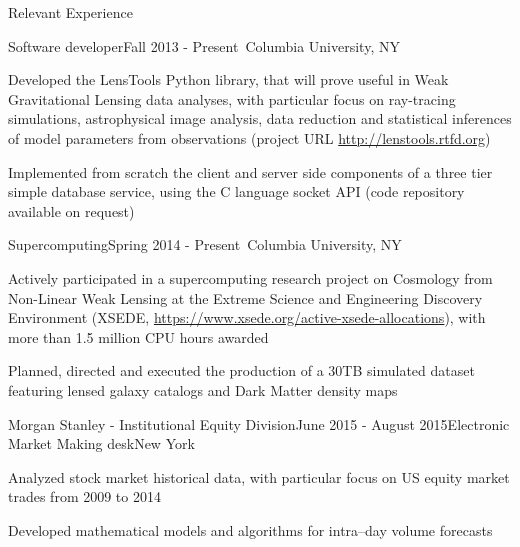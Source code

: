 \documentclass{resume} %
\begin{document}
\begin{rSection}{Relevant Experience}

\begin{rSubsection}{Software developer}{Fall 2013 - Present}{\textcolor{white}{a}}{Columbia University, NY}
\item Developed the LensTools Python library, that will prove useful in Weak Gravitational Lensing data analyses, with particular focus on ray-tracing simulations, astrophysical image analysis, data reduction and statistical inferences of model parameters from observations (project URL \url{http://lenstools.rtfd.org})
\item Implemented from scratch the client and server side components of a three tier simple database service, using the C language socket API (code repository available on request)
\end{rSubsection}

\begin{rSubsection}{Supercomputing}{Spring 2014 - Present}{\textcolor{white}{a}}{Columbia University, NY}
\item Actively participated in a supercomputing research project on Cosmology from Non-Linear Weak Lensing at the Extreme Science and Engineering Discovery Environment (XSEDE, \url{https://www.xsede.org/active-xsede-allocations}), with more than 1.5 million CPU hours awarded
\item Planned, directed and executed the production of a 30TB simulated dataset featuring lensed galaxy catalogs and Dark Matter density maps 
\end{rSubsection}

\begin{rSubsection}{Morgan Stanley - Institutional Equity Division}{June 2015 - August 2015}{Electronic Market Making desk}{New York}
\item Analyzed stock market historical data, with particular focus on US equity market trades from 2009 to 2014
\item Developed mathematical models and algorithms for intra--day volume forecasts 
\end{rSubsection}

\end{rSection}

\end{document}
